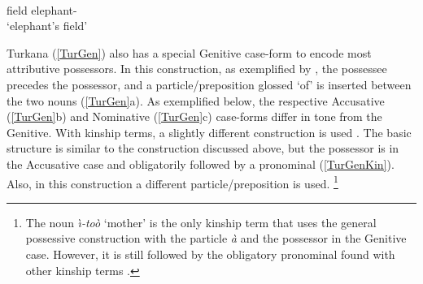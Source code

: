 \begin{exe}
\ex\label{TenGen}
\gll{}   \\
field \am{} elephant-\gen{}\\
\glt `elephant's field'  
\end{exe}

Turkana (\ref{TurGen}) also has a special Genitive case-form to encode most attributive possessors.
In this construction, as exemplified by \citet[266--268]{Dimmendaal:1982}, the possessee precedes the possessor, and a particle/preposition glossed `of' is inserted between the two nouns (\ref{TurGen}a). 
As exemplified below, the respective Accusative (\ref{TurGen}b) and Nominative (\ref{TurGen}c) case-forms differ in tone from the Genitive.
With kinship terms, a slightly different construction is used \citep[340]{Dimmendaal:1982}. 
The basic structure is similar to the construction discussed above, but the possessor is in the Accusative case and obligatorily followed by a pronominal (\ref{TurGenKin}). 
Also, in this construction a different particle/preposition is used.
\footnote{The noun \emph{\`\i-to\`o} `mother' is the only kinship term that uses the general possessive construction with the particle \emph{\`a} and the possessor in the Genitive case. However, it is still followed by the obligatory pronominal found with other kinship terms \citep[240]{Dimmendaal:1982}.} 

\pagebreak

\begin{exe}\ex\label{TurGen}
\end{exe}

